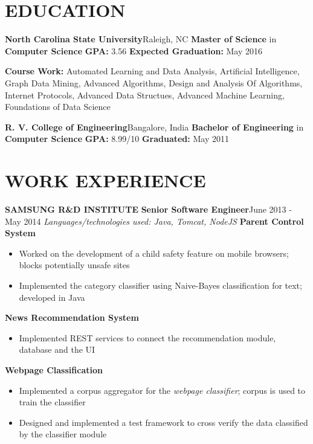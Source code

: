 \documentclass{article}
\begin{document}
	\begin{multicols}{2}
		\section*{EDUCATION}
			\vspace{0.2cm}
			{\bfseries \large North Carolina State University}\hfill Raleigh, NC\newline
			{\bfseries Master of Science} in {\bfseries Computer Science} \newline
			{\bfseries GPA:} 3.56 \hfill {\bfseries Expected Graduation:} May 2016\par
			{\bfseries Course Work:} Automated Learning and Data Analysis, Artificial Intelligence, Graph Data Mining, Advanced Algorithms, Design and Analysis Of Algorithms, Internet Protocols, Advanced Data Structues, Advanced Machine Learning, Foundations of Data Science\newline
			\par
			{\bfseries \large R. V. College of Engineering}\hfill Bangalore, India\newline
			{\bfseries Bachelor of Engineering} in {\bfseries Computer Science} \newline
			{\bfseries GPA:} 8.99/10 \hfill {\bfseries Graduated:} May 2011


		\section*{WORK EXPERIENCE}
			\vspace{0.2cm}
			{\bfseries SAMSUNG R\&D INSTITUTE}\newline
			{\bfseries \small Senior Software Engineer}\hfill{June 2013 - May 2014}\newline
				\textit{Languages/technologies used: Java, Tomcat, NodeJS}\newline
				{\bfseries Parent Control System}
				\begin{itemize}[nolistsep,leftmargin=*]
					\item Worked on the development of a child safety feature on mobile browsers; blocks potentially unsafe sites
					\item Implemented the category classifier using Naive-Bayes classification for text; developed in Java
				\end{itemize}
				{\bfseries News Recommendation System}
				\begin{itemize}[nolistsep,leftmargin=*]
					\item Implemented REST services to connect the recommendation module, database and the UI
				\end{itemize}
				{\bfseries Webpage Classification}
				\begin{itemize}[nolistsep,leftmargin=*]
					\item Implemented a corpus aggregator for the \textit{webpage classifier}; corpus is used to train the classifier
					\item Designed and implemented a test framework to cross verify the data classified by the classifier module
				\end{itemize}
			\vspace{0.3cm}



\end{multicols}
\end{document}
